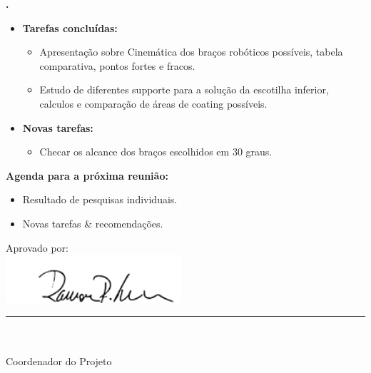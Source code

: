 			
   \textbf{\renan.} 
	\begin{itemize}
		\item \textbf{Tarefas concluídas:}
			\begin{itemize}    
				\item Apresentação sobre Cinemática dos braços robóticos possíveis, 
				tabela comparativa, pontos fortes e fracos.
				\item Estudo de diferentes supporte para a solução da escotilha inferior,
				calculos e comparação de áreas de coating possíveis.
			\end{itemize}
		
		\item \textbf{Novas tarefas:}
			\begin{itemize} 
			    \item Checar os alcance dos braços escolhidos em 30 graus.
			\end{itemize}
	\end{itemize}		



\textbf{Agenda para a próxima reunião:}
  \begin{itemize}
    \item Resultado de pesquisas individuais.
    \item Novas tarefas \& recomendações.
  \end{itemize}


\vspace{5mm}%
\parbox[t]{70mm}{
  Aprovado por: \\[5mm]
  \centering
  \includegraphics[width=65mm]{figs/logo/assinatura-ramon.png} \\[-4mm]
  \rule[2mm]{70mm}{0.1mm} \\
  \ramon \\[1mm]
  Coordenador do Projeto \\
}

\fim